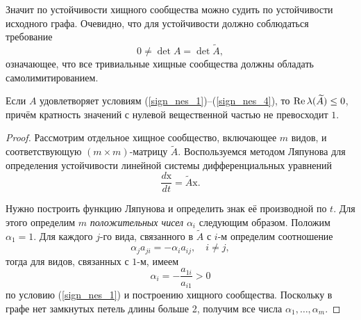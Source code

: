     Значит по устойчивости хищного сообщества можно судить по устойчивости исходного графа. Очевидно, что для устойчивости должно соблюдаться требование 
    \begin{equation*}
        0 \neq \det A = \det \widetilde{A},
    \end{equation*}
    означающее, что все тривиальные хищные сообщества должны обладать самолимитированием.
    
    \begin{theorem} \label{theorem_sign_spectre}
        Если \(A\) удовлетворяет условиям (\ref{sign_nes_1})--(\ref{sign_nes_4}), то \(\operatorname{Re} \lambda(\widetilde{A}) \leq 0 \), причём кратность значений с нулевой вещественной частью не превосходит \(1\).
    \end{theorem}
    \begin{proof}
        Рассмотрим отдельное хищное сообщество, включающее \(m\) видов, и соответствующую \((m \times m)\)-матрицу \(\widetilde{A}\). Воспользуемся методом Ляпунова для определения устойчивости линейной системы дифференциальных уравнений 
        \begin{equation} \label{sign_hunter_ode}
            \frac{d \mathrm{x}}{dt} = \widetilde{A} \mathrm{x}.
        \end{equation}

        Нужно построить функцию Ляпунова и определить знак её производной по \(t\). Для этого определим \(m\) \textit{положительных чисел} \(\alpha_i\) следующим образом. Положим \(\alpha_1 = 1\). Для каждого \(j\)-го вида, связанного в \(\widetilde{A}\) с \(i\)-м определим соотношение
        \begin{equation} \label{sign_conntcnted_ij}
            \alpha_j a_{ji} = -\alpha_i a_{ij}, \quad i \neq j,
        \end{equation}
        тогда для видов, связанных с \(1\)-м, имеем
        \begin{equation} \label{sign_conntcnted_1}
            \alpha_i = - \frac{a_{1i}}{a_{i1}} > 0
        \end{equation}
        по условию (\ref{sign_nes_1}) и построению хищного сообщества. Поскольку в графе нет замкнутых петель длины больше 2, получим все числа \(\alpha_1, \dots, \alpha_m\).


\end{proof}
